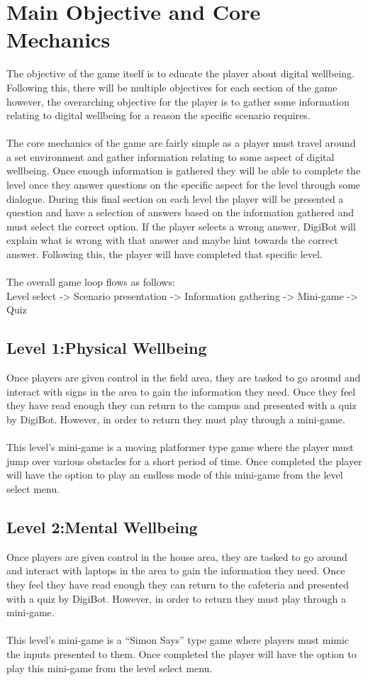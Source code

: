 \documentclass[a4paper]{scrreprt}
\begin{document}
\section{Main Objective and Core Mechanics}
The objective of the game itself is to educate the player about digital wellbeing. Following this, there will be multiple objectives for each section of the game however, the overarching objective for the player is to gather some information relating to digital wellbeing for a reason the specific scenario requires.
\\\\
The core mechanics of the game are fairly simple as a player must travel around a set environment and gather information relating to some aspect of digital wellbeing. Once enough information is gathered they will be able to complete the level once they answer questions on the specific aspect for the level through some dialogue. During this final section on each level the player will be presented a question and have a selection of answers based on the information gathered and must select the correct option. If the player selects a wrong answer, DigiBot will explain what is wrong with that answer and maybe hint towards the correct answer. Following this, the player will have completed that specific level.
\\\\
The overall game loop flows as follows:
\\
Level select -> Scenario presentation -> Information gathering -> Mini-game -> Quiz

\subsection{Level 1:Physical Wellbeing}
Once players are given control in the field area, they are tasked to go around and interact with signs in the area to gain the information they need. Once they feel they have read enough they can return to the campus and presented with a quiz by DigiBot. However, in order to return they must play through a mini-game. 
\\\\
This level's mini-game is a moving platformer type game where the player must jump over various obstacles for a short period of time. Once completed the player will have the option to play an endless mode of this mini-game from the level select menu.

\subsection{Level 2:Mental Wellbeing}
Once players are given control in the house area, they are tasked to go around and interact with laptops in the area to gain the information they need. Once they feel they have read enough they can return to the cafeteria and presented with a quiz by DigiBot. However, in order to return they must play through a mini-game. 
\\\\
This level's mini-game is a ``Simon Says'' type game where players must mimic the inputs presented to them. Once completed the player will have the option to play this mini-game from the level select menu.
\end{document}
